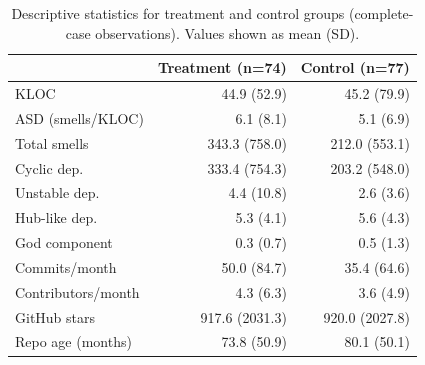 \begin{table}[!h]

\caption{\label{tab:descriptive}Descriptive statistics for treatment and control groups (complete-case observations). Values shown as mean (SD).}
\centering
\begin{tabular}[t]{lrr}
\toprule
 & Treatment (n=74) & Control (n=77)\\
\midrule
KLOC & 44.9 (52.9) & 45.2 (79.9)\\
ASD (smells/KLOC) & 6.1 (8.1) & 5.1 (6.9)\\
Total smells & 343.3 (758.0) & 212.0 (553.1)\\
Cyclic dep. & 333.4 (754.3) & 203.2 (548.0)\\
Unstable dep. & 4.4 (10.8) & 2.6 (3.6)\\
\addlinespace
Hub-like dep. & 5.3 (4.1) & 5.6 (4.3)\\
God component & 0.3 (0.7) & 0.5 (1.3)\\
Commits/month & 50.0 (84.7) & 35.4 (64.6)\\
Contributors/month & 4.3 (6.3) & 3.6 (4.9)\\
GitHub stars & 917.6 (2031.3) & 920.0 (2027.8)\\
\addlinespace
Repo age (months) & 73.8 (50.9) & 80.1 (50.1)\\
\bottomrule
\end{tabular}
\end{table}
